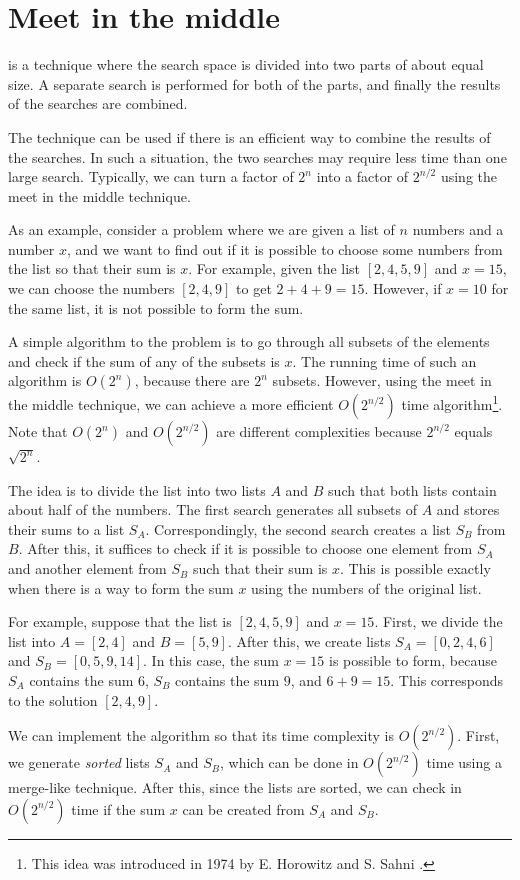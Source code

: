 \section{Meet in the middle}


 is a technique
where the search space is divided into
two parts of about equal size.
A separate search is performed
for both of the parts,
and finally the results of the searches are combined.

The technique can be used
if there is an efficient way to combine the
results of the searches.
In such a situation, the two searches may require less
time than one large search.
Typically, we can turn a factor of $2^n$
into a factor of $2^{n/2}$ using the meet in the
middle technique.

As an example, consider a problem where
we are given a list of $n$ numbers and
a number $x$,
and we want to find out if it is possible
to choose some numbers from the list so that
their sum is $x$.
For example, given the list $[2,4,5,9]$ and $x=15$,
we can choose the numbers $[2,4,9]$ to get $2+4+9=15$.
However, if $x=10$ for the same list,
it is not possible to form the sum.

A simple algorithm to the problem is to
go through all subsets of the elements and
check if the sum of any of the subsets is $x$.
The running time of such an algorithm is $O(2^n)$,
because there are $2^n$ subsets.
However, using the meet in the middle technique,
we can achieve a more efficient $O(2^{n/2})$ time algorithm\footnote{This
idea was introduced in 1974 by E. Horowitz and S. Sahni \cite{hor74}.}.
Note that $O(2^n)$ and $O(2^{n/2})$ are different
complexities because $2^{n/2}$ equals $\sqrt{2^n}$.

The idea is to divide the list into
two lists $A$ and $B$ such that both
lists contain about half of the numbers.
The first search generates all subsets
of $A$ and stores their sums to a list $S_A$.
Correspondingly, the second search creates
a list $S_B$ from $B$.
After this, it suffices to check if it is possible
to choose one element from $S_A$ and another
element from $S_B$ such that their sum is $x$.
This is possible exactly when there is a way to
form the sum $x$ using the numbers of the original list.

For example, suppose that the list is $[2,4,5,9]$ and $x=15$.
First, we divide the list into $A=[2,4]$ and $B=[5,9]$.
After this, we create lists
$S_A=[0,2,4,6]$ and $S_B=[0,5,9,14]$.
In this case, the sum $x=15$ is possible to form,
because $S_A$ contains the sum $6$,
$S_B$ contains the sum $9$, and $6+9=15$.
This corresponds to the solution $[2,4,9]$.

We can implement the algorithm so that
its time complexity is $O(2^{n/2})$.
First, we generate \emph{sorted} lists $S_A$ and $S_B$,
which can be done in $O(2^{n/2})$ time using a merge-like technique.
After this, since the lists are sorted,
we can check in $O(2^{n/2})$ time if
the sum $x$ can be created from $S_A$ and $S_B$.